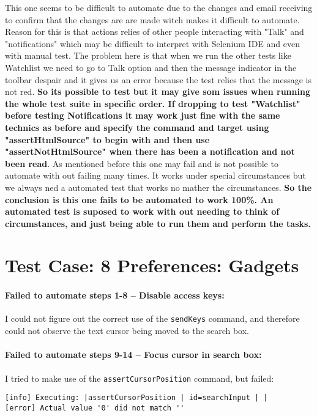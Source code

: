 \documentclass[a4paper,10pt]{article}
\begin{document}
This one seems to be difficult to automate due to the changes and email receiving to confirm that the changes are 
are made witch makes it difficult to automate. Reason for this is that actions relies of other people interacting with "Talk"
and "notifications" which may be difficult to interpret with Selenium IDE and even with manual test. The problem here is that when we run
the other tests like Watchlist we need to go to Talk option and then the message indicator in the toolbar despair and it gives us an error
because the test relies that the message is not red. \textbf{\color{red} So its possible to test but it may give som issues when running the whole test suite in
specific order. If dropping to test "Watchlist" before testing Notifications it may work just fine with the same technics as before
and specify the command and target using "assertHtmlSource" to begin with and then use  "assertNotHtmlSource" when there has been a
notification and not been read}. As mentioned before this one may fail and is not possible to automate with out failing many times.
It works under special circumstances but we always ned a automated test that works no mather the circumstances. \textbf{\color{red}So the conclusion is
this one fails to be automated to work 100\%. 
An automated test is suposed to work with out needing to think of circumstances, and just being able to run them and perform the tasks.}


\section*{Test Case: 8 Preferences: Gadgets}

\paragraph*{Failed to automate steps 1-8 -- Disable access keys:} I could not figure out the correct use of the \texttt{sendKeys} command, and therefore could not observe the text cursor being 
moved to the search box.

\paragraph*{Failed to automate steps 9-14 -- Focus cursor in search box:} I tried to make use of the \texttt{assertCursorPosition} command, but failed:

\begin{verbatim}
[info] Executing: |assertCursorPosition | id=searchInput | |
[error] Actual value '0' did not match ''
\end{verbatim}
\end{document}
